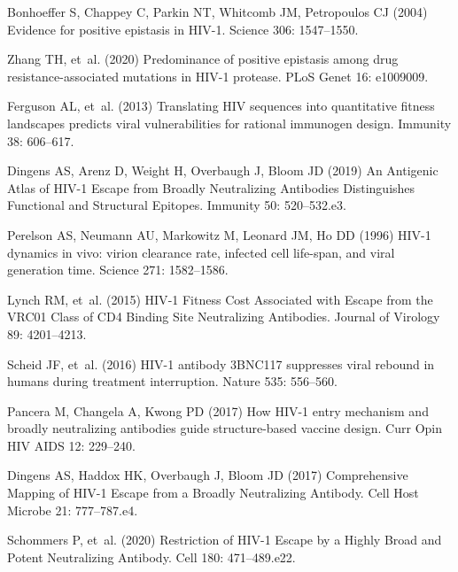 \documentclass[aps,prx,noshowpacs,twocolumn,nofootinbib]{revtex4-2}
\begin{document}
\begin{thebibliography}{10}
Bonhoeffer S, Chappey C, Parkin NT, Whitcomb JM, Petropoulos CJ (2004)
  {Evidence for positive epistasis in HIV-1.}
\newblock Science 306: 1547--1550.

Zhang TH, et~al. (2020) {Predominance of positive epistasis among drug
  resistance-associated mutations in HIV-1 protease.}
\newblock PLoS Genet 16: e1009009.

Ferguson AL, et~al. (2013) {Translating HIV sequences into quantitative fitness
  landscapes predicts viral vulnerabilities for rational immunogen design}.
\newblock Immunity 38: 606--617.

Dingens AS, Arenz D, Weight H, Overbaugh J, Bloom JD (2019) {An Antigenic Atlas
  of HIV-1 Escape from Broadly Neutralizing Antibodies Distinguishes Functional
  and Structural Epitopes}.
\newblock Immunity 50: 520--532.e3.

Perelson AS, Neumann AU, Markowitz M, Leonard JM, Ho DD (1996) {HIV-1 dynamics
  in vivo: virion clearance rate, infected cell life-span, and viral generation
  time.}
\newblock Science 271: 1582--1586.

Lynch RM, et~al. (2015) {{HIV}}-1 {{Fitness Cost Associated}} with {{Escape}}
  from the {{VRC01 Class}} of {{CD4 Binding Site Neutralizing Antibodies}}.
\newblock Journal of Virology 89: 4201--4213.

Scheid JF, et~al. (2016) {{HIV}}-1 antibody {{3BNC117}} suppresses viral
  rebound in humans during treatment interruption.
\newblock Nature 535: 556--560.

Pancera M, Changela A, Kwong PD (2017) {How HIV-1 entry mechanism and broadly
  neutralizing antibodies guide structure-based vaccine design.}
\newblock Curr Opin HIV AIDS 12: 229--240.

Dingens AS, Haddox HK, Overbaugh J, Bloom JD (2017) {Comprehensive Mapping of
  HIV-1 Escape from a Broadly Neutralizing Antibody.}
\newblock Cell Host Microbe 21: 777--787.e4.

Schommers P, et~al. (2020) {Restriction of HIV-1 Escape by a Highly Broad and
  Potent Neutralizing Antibody.}
\newblock Cell 180: 471--489.e22.


\end{thebibliography}
\end{document}
